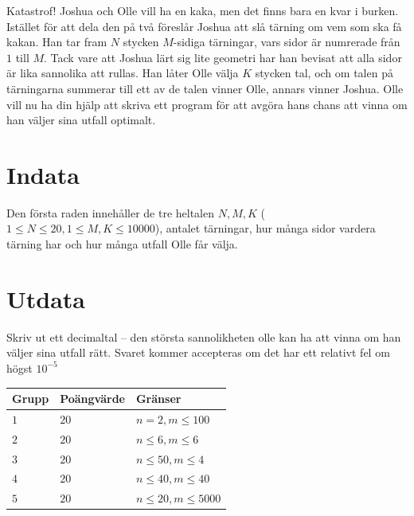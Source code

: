 Katastrof! Joshua och Olle vill ha en kaka, men det finns bara en kvar i burken. Istället för att dela den på två föreslår Joshua att slå tärning om vem som ska få kakan.
Han tar fram $N$ stycken $M$-sidiga tärningar, vars sidor är numrerade från $1$ till $M$. Tack vare att Joshua lärt sig lite geometri har han bevisat att alla sidor är lika sannolika att rullas.
Han låter Olle välja $K$ stycken tal, och om talen på tärningarna summerar till ett av de talen vinner Olle, annars vinner Joshua.
Olle vill nu ha din hjälp att skriva ett program för att avgöra hans chans att vinna om han väljer sina utfall optimalt.


\section*{Indata}
Den första raden innehåller de tre heltalen $N, M, K$ ($1 \le N \le 20, 1 \le M, K \le 10000$), antalet tärningar, hur många sidor vardera tärning har och hur många utfall Olle får välja.

\section*{Utdata}
Skriv ut ett decimaltal -- den största sannolikheten olle kan ha att vinna om han väljer sina utfall rätt. 
Svaret kommer accepteras om det har ett relativt fel om högst $10^{-5}$

\noindent
\begin{tabular}{| l | l | p{12cm} |}
  \hline
  Grupp & Poängvärde & Gränser \\ \hline
  $1$    & $20$        & $n=2,m \le 100 $   \\ \hline 
  $2$    & $20$        & $n \le 6,  m \le 6 $  \\ \hline
  $3$    & $20$        & $n \le 50, m \le 4 $  \\ \hline 
  $4$    & $20$        & $n \le 40, m \le 40 $  \\ \hline
  $5$    & $20$        & $n \le 20, m \le 5000 $  \\ \hline
\end{tabular}
